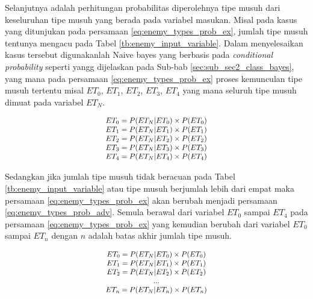 Selanjutnya adalah perhitungan probabilitas diperolehnya tipe musuh dari keseluruhan tipe musuh yang berada pada variabel masukan. Misal pada kasus yang ditunjukan pada persamaan \ref{eq:enemy_types_prob_ex}, jumlah tipe musuh tentunya mengacu pada Tabel \ref{tb:enemy_input_variable}. Dalam menyelesaikan kasus tersebut digunakanlah Naive bayes yang berbasis pada \textit{conditional probability} seperti yangg dijelaskan pada Sub-bab \ref{sec:sub_sec2_class_bayes}, yang mana pada persamaan \ref{eq:enemy_types_prob_ex} proses kemunculan tipe musuh tertentu misal $ET_{0}$, $ET_{1}$, $ET_{2}$, $ET_{3}$, $ET_{4}$ yang mana seluruh tipe musuh dimuat pada variabel $ET_{N}$.

\begin{equation}\label{eq:enemy_types_prob_ex}
\resizebox{0.35\textwidth}{!}{%
	$\begin{matrix}
	ET_{0} = P(ET_{N}| ET_{0}) \times P(ET_{0})\\
	ET_{1} = P(ET_{N}| ET_{1}) \times P(ET_{1})\\
	ET_{2} = P(ET_{N}| ET_{2}) \times P(ET_{2})\\
	ET_{3} = P(ET_{N}| ET_{3}) \times P(ET_{3})\\
	ET_{4} = P(ET_{N}| ET_{4}) \times P(ET_{4})
	\end{matrix}$%
}
\end{equation}

Sedangkan jika jumlah tipe musuh tidak beracuan pada Tabel \ref{tb:enemy_input_variable} atau tipe musuh berjumlah lebih dari empat maka persamaan \ref{eq:enemy_types_prob_ex} akan berubah menjadi persamaan \ref{eq:enemy_types_prob_adv}. Semula berawal dari variabel $ET_{0}$ sampai $ET_{4}$ pada persamaan \ref{eq:enemy_types_prob_ex} yang kemudian berubah dari variabel $ET_{0}$ sampai $ET_{n}$ dengan $n$ adalah batas akhir jumlah tipe musuh.

\begin{equation}\label{eq:enemy_types_prob_adv}
\resizebox{0.35\textwidth}{!}{%
	$\begin{matrix}
	ET_{0} = P(ET_{N}| ET_{0}) \times P(ET_{0})\\
	ET_{1} = P(ET_{N}| ET_{1}) \times P(ET_{1})\\
	ET_{2} = P(ET_{N}| ET_{2}) \times P(ET_{2})\\
	...\\
	ET_{n} = P(ET_{N}| ET_{n}) \times P(ET_{n})
	\end{matrix}$%
}
\end{equation}

